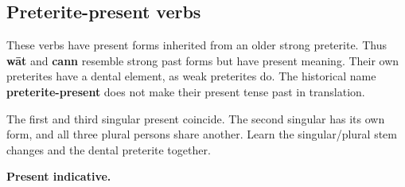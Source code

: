 \subsection*{Preterite-present verbs}

These verbs have present forms inherited from an older strong preterite. Thus \textbf{wāt} and \textbf{cann} resemble strong past forms but have present meaning. Their own preterites have a dental element, as weak preterites do. The historical name \textbf{preterite-present} does not make their present tense past in translation.

The first and third singular present coincide. The second singular has its own form, and all three plural persons share another. Learn the singular/\allowbreak{}plural stem changes and the dental preterite together.

\textbf{Present indicative.}

